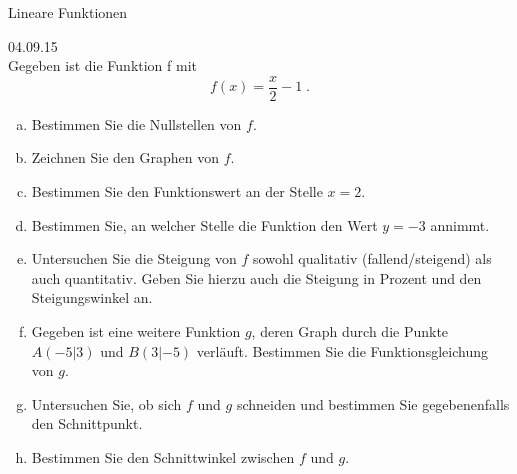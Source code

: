 \documentclass[12pt,fleqn]{article}
\theoremstyle{aufg}
\theoremstyle{bsp}
\begin{document}
 
    \begin{flushleft}
\begin{center}Lineare Funktionen\end{center} 04.09.15 \\[2em]Gegeben ist die Funktion f mit\[f(x)=\frac{x}{2} - 1\; . \]\begin{enumerate}[a)] 
\item 
Bestimmen Sie die Nullstellen von $f$. \\ 

\item 
Zeichnen Sie den Graphen von $f$. \\ 

\item 
Bestimmen Sie den Funktionswert an der Stelle $x=2$. \\ 

\item 
Bestimmen Sie, an welcher Stelle die Funktion den Wert $y=-3$ annimmt. \\ 

\item 
Untersuchen Sie die Steigung von $f$ sowohl qualitativ (fallend/steigend) als auch quantitativ. Geben Sie hierzu auch die Steigung in Prozent und den Steigungswinkel an. \\ 

\item 
Gegeben ist eine weitere Funktion $g$, deren Graph durch die Punkte $A(-5|3)$ und $B(3|-5)$ verl\"auft. Bestimmen Sie die Funktionsgleichung von $g$. \\ 

\item 
Untersuchen Sie, ob sich $f$ und $g$ schneiden und bestimmen Sie gegebenenfalls den Schnittpunkt. \\ 

\item 
Bestimmen Sie den Schnittwinkel zwischen $f$ und $g$. \\ 

\end{enumerate} 
\end{flushleft} 
\end{document}
